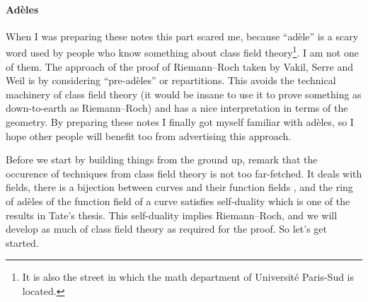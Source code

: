 \documentclass[10pt,a4paper]{article}
\begin{document}
\paragraph{Ad\`eles}
When I was preparing these notes this part scared me, because ``ad\`ele'' is a scary word used by people who know something about class field theory\footnote{It is also the street in which the math department of Universit\'e Paris-Sud is located.}. I am not one of them. The approach of the proof of Riemann--Roch taken by Vakil, Serre and Weil is by considering ``pre-ad\`eles'' or repartitions. This avoids the technical machinery of class field theory (it would be insane to use it to prove something as down-to-earth as Riemann--Roch) and has a nice interpretation in terms of the geometry. By preparing these notes I finally got myself familiar with ad\`eles, so I hope other people will benefit too from advertising this approach.

Before we start by building things from the ground up, remark that the occurence of techniques from class field theory is not too far-fetched. It deals with fields, there is a bijection between curves and their function fields \cite[\S I.6]{hartshorne-algebraic-geometry}, and the ring of ad\`eles of the function field of a curve satisfies self-duality which is one of the results in Tate's thesis. This self-duality implies Riemann--Roch, and we will develop as much of class field theory as required for the proof. So let's get started.
\end{document}
